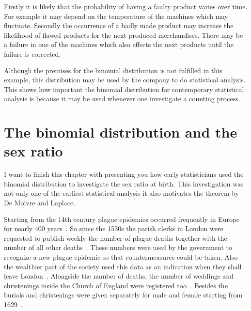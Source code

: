 Firstly it is likely that the probability of having a faulty product varies over time. For example it may depend on the temperature of the machines which may fluctuate. Secondly the occurrence of a badly made product may increase the likelihood of flawed products for the next produced merchandises. There may be a failure in one of the machines which also effects the next products until the failure is corrected.

Although the premises for the binomial distribution is not fulfilled in this example, this distribution may be used by the company to do statistical analysis. This shows how important the binomial distribution for contemporary statistical analysis is because it may be used whenever one investigate a counting process.

\section{The binomial distribution and the sex ratio}



I want to finish this chapter with presenting you how early statisticians used the binomial distribution to investigate the sex ratio at birth. This investigation was not only one of the earliest statistical analysis it also motivates the theorem by De Moivre and Laplace.

Starting from the 14th century plague epidemics occurred frequently in Europe for nearly 400 years~\cite[p. 82]{hald1}. So since the 1530s the parish clerks in London were requested to publish weekly the number of plague deaths together with the number of all other deaths~\cite[p. 82]{hald1}. These numbers were used by the government to recognize a new plague epidemic so that countermeasures could be taken. Also the wealthier part of the society used this data as an indication when they shall leave London~\cite[pp. 82-83]{hald1}. Alongside the number of deaths, the number of weddings and christenings inside the Church of England were registered too~\cite[p. 83]{hald1}. Besides the burials and christenings were given separately for male and female starting from 1629~\cite[p. 83]{hald1}.

